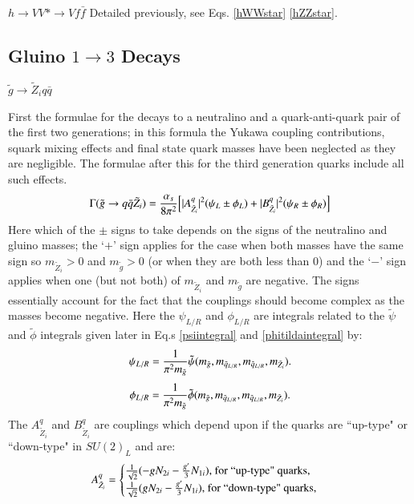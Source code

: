\documentclass[final,3p,times]{elsarticle}
\begin{document}
\textbf{\underline{$h \rightarrow VV* \rightarrow V f \bar{f}$}}
Detailed previously, see Eqs. \eqref{hWWstar} \eqref{hZZstar}.

\subsection{Gluino $1 \rightarrow 3$ Decays} \label{gluino3bodydecays}

\underline{$\tilde{g} \rightarrow \tilde{Z}_i q \bar{q}$}

First the formulae for the decays to a neutralino and a quark-anti-quark pair of the first two generations; in this formula the Yukawa coupling contributions, squark mixing effects and final state quark masses have been neglected as they are negligible. The formulae after this for the third generation quarks include all such effects.
\begin{equation} \label{gqqneut}
\Gamma(\tilde{g} \rightarrow q \bar{q} \tilde{Z}_i) = {\alpha_s \over 8 \pi^2 }\Big[|A_{{\tilde{Z}_i}}^{q}|^2 (\psi_{L} \pm \phi_{L}) + |B_{{\tilde{Z}_i}}^{q}|^2 (\psi_{R} \pm \phi_{R})\Big]
\end{equation}
Here which of the $\pm$ signs to take depends on the signs of the neutralino and gluino masses; the `$+$' sign applies for the case when both masses have the same sign so $m_{\tilde{Z}_i} > 0$ and $m_{\tilde{g}} > 0$ (or when they are both less than 0) and the `$-$' sign applies when one (but not both) of $m_{\tilde{Z}_i}$ and $m_{\tilde{g}}$ are negative. The signs essentially account for the fact that the couplings should become complex as the masses become negative.
Here the $\psi_{L/R}$ and $\phi_{L/R}$ are integrals related to the $\tilde{\psi}$ and $\tilde{\phi}$ integrals given later in Eq.s \eqref{psiintegral} and \eqref{phitildaintegral} by:
\begin{equation}
\psi_{L/R} = {1 \over \pi^2 m_{\tilde{g}}} \tilde{\psi}(m_{\tilde{g}},m_{\tilde{q}_{L/R}},m_{\tilde{q}_{L/R}},m_{\tilde{Z}_i}).
\end{equation}
\begin{equation}
\phi_{L/R} = {1 \over \pi^2 m_{\tilde{g}}} \tilde{\phi}(m_{\tilde{g}},m_{\tilde{q}_{L/R}},m_{\tilde{q}_{L/R}},m_{\tilde{Z}_i}).
\end{equation}
The $A_{{\tilde{Z}_i}}^{q}$ and $B_{{\tilde{Z}_i}}^{q}$ are couplings which depend upon if the quarks are ``up-type" or ``down-type" in $SU(2)_L$ and are:
\begin{equation}
A_{{\tilde{Z}_i}}^{q} = \begin{cases} 
						{1 \over \sqrt{2}} (-gN_{2i} - {g' \over 3}N_{1i})$, for ``up-type" quarks,$ \\
						{1 \over \sqrt{2}} (gN_{2i} - {g' \over 3}N_{1i})$, for ``down-type" quarks,$
						\end{cases}
\end{equation}
\end{document}
